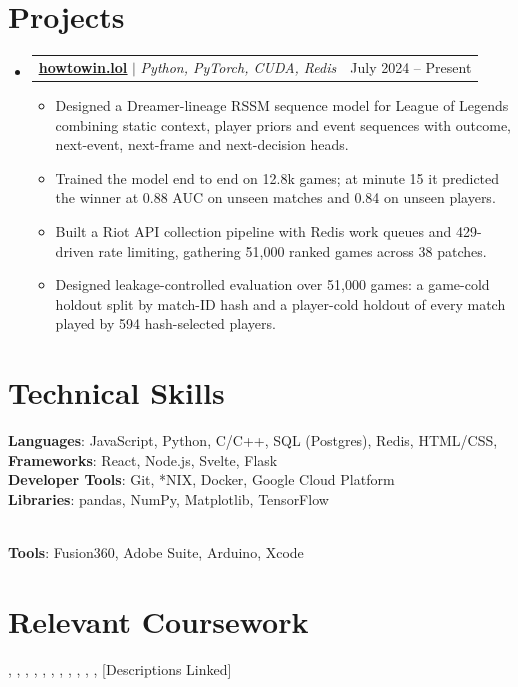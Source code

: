 \documentclass[letterpaper,11pt]{article}
\makeatletter
\newcommand{\resumeItem}[1]{
  \item\small{
    {#1 \vspace{-2pt}}
  }
}
\newcommand{\resumeProjectHeading}[2]{
    \item
    \begin{tabular*}{0.97\textwidth}{l@{\extracolsep{\fill}}r}
      \small#1 & #2 \\
    \end{tabular*}\vspace{-7pt}
}
\newcommand{\resumeSubHeadingListStart}{\begin{itemize}[leftmargin=0.15in, label={}]}
\newcommand{\resumeSubHeadingListEnd}{\end{itemize}}
\newcommand{\resumeItemListStart}{\begin{itemize}}
\newcommand{\resumeItemListEnd}{\end{itemize}\vspace{-5pt}}
\makeatother
\begin{document}
\section{Projects}
    \resumeSubHeadingListStart
          
      \resumeProjectHeading
          {\textbf{\href{https://github.com/nyx-haile/howtowin.lol}{\underline{howtowin.lol}}} $|$ \emph{Python, PyTorch, CUDA, Redis}}{July 2024 -- Present}
          \resumeItemListStart
            \resumeItem{Designed a Dreamer-lineage RSSM sequence model for League of Legends combining static context, player priors and event sequences with outcome, next-event, next-frame and next-decision heads.}
            \resumeItem{Trained the model end to end on 12.8k games; at minute 15 it predicted the winner at 0.88 AUC on unseen matches and 0.84 on unseen players.}
            \resumeItem{Built a Riot API collection pipeline with Redis work queues and 429-driven rate limiting, gathering 51{,}000 ranked games across 38 patches.}
            \resumeItem{Designed leakage-controlled evaluation over 51{,}000 games: a game-cold holdout split by match-ID hash and a player-cold holdout of every match played by 594 hash-selected players.}
          \resumeItemListEnd
    \resumeSubHeadingListEnd


%
\section{Technical Skills}
 \begin{itemize}[leftmargin=0.1625in, label={}]
    \small{\item{
     \textbf{Languages}{: JavaScript, Python, C/C++, SQL (Postgres), Redis, HTML/CSS, } \\
     \textbf{Frameworks}{: React, Node.js, Svelte, Flask} \\
     \textbf{Developer Tools}{: Git, *NIX, Docker, Google Cloud Platform} \\
     \textbf{Libraries}{: pandas, NumPy, Matplotlib, TensorFlow}
    }}\\
    \textbf{Tools}{: Fusion360, Adobe Suite, Arduino, Xcode }
 \end{itemize}
\section{Relevant Coursework}
    , , , , , , , ,  , , ,
    [Descriptions Linked]
    

\end{document}

